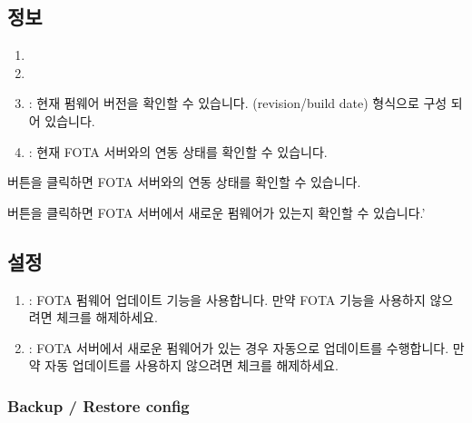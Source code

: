 \documentclass[letterpaper,10pt,english]{sphinxmanual}
\begin{document}
\subsection{정보}
\label{\detokenize{main_menu/system:id8}}
\noindent{}
\begin{enumerate}
%
\item {} 
\sphinxAtStartPar
{}

\item {} 
\sphinxAtStartPar
{}

\item {} 
\sphinxAtStartPar
{} : 현재 펌웨어 버전을 확인할 수 있습니다. (revision/build date) 형식으로 구성 되어 있습니다.

\item {} 
\sphinxAtStartPar
{} : 현재 FOTA 서버와의 연동 상태를 확인할 수 있습니다.

\end{enumerate}

\sphinxAtStartPar
{} 버튼을 클릭하면 FOTA 서버와의 연동 상태를 확인할 수 있습니다.

\sphinxAtStartPar
{} 버튼을 클릭하면 FOTA 서버에서 새로운 펌웨어가 있는지 확인할 수 있습니다.’


\subsection{설정}
\label{\detokenize{main_menu/system:id9}}
\noindent{}
\begin{enumerate}
%
\item {} 
\sphinxAtStartPar
{} : FOTA 펌웨어 업데이트 기능을 사용합니다. 만약 FOTA 기능을 사용하지 않으려면 체크를 해제하세요.

\item {} 
\sphinxAtStartPar
{} : FOTA 서버에서 새로운 펌웨어가 있는 경우 자동으로 업데이트를 수행합니다. 만약 자동 업데이트를 사용하지 않으려면 체크를 해제하세요.

\end{enumerate}


\subsubsection{Backup / Restore config}
\label{\detokenize{main_menu/system:backup-restore-config}}
\noindent{}
\end{document}
